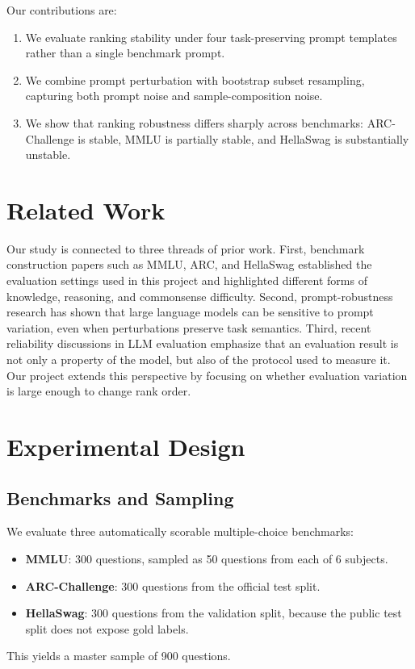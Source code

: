 \documentclass[11pt]{article}
\begin{document}
Our contributions are:
\begin{enumerate}[leftmargin=1.5em]
\item We evaluate ranking stability under four task-preserving prompt templates rather than a single benchmark prompt.
\item We combine prompt perturbation with bootstrap subset resampling, capturing both prompt noise and sample-composition noise.
\item We show that ranking robustness differs sharply across benchmarks: ARC-Challenge is stable, MMLU is partially stable, and HellaSwag is substantially unstable.
\end{enumerate}

\section{Related Work}

Our study is connected to three threads of prior work. First, benchmark construction papers such as MMLU, ARC, and HellaSwag established the evaluation settings used in this project and highlighted different forms of knowledge, reasoning, and commonsense difficulty. Second, prompt-robustness research has shown that large language models can be sensitive to prompt variation, even when perturbations preserve task semantics. Third, recent reliability discussions in LLM evaluation emphasize that an evaluation result is not only a property of the model, but also of the protocol used to measure it. Our project extends this perspective by focusing on whether evaluation variation is large enough to change rank order.

\section{Experimental Design}

\subsection{Benchmarks and Sampling}

We evaluate three automatically scorable multiple-choice benchmarks:
\begin{itemize}[leftmargin=1.5em]
\item \textbf{MMLU}: 300 questions, sampled as 50 questions from each of 6 subjects.
\item \textbf{ARC-Challenge}: 300 questions from the official test split.
\item \textbf{HellaSwag}: 300 questions from the validation split, because the public test split does not expose gold labels.
\end{itemize}
This yields a master sample of 900 questions.
\end{document}
